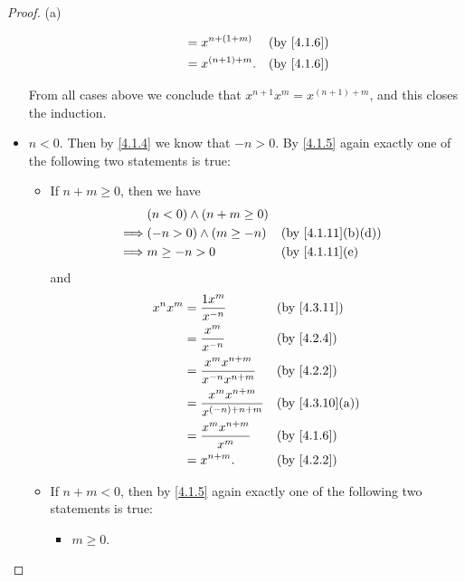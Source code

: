 \begin{proof}{(a)}
\begin{itemize}
\begin{itemize}
\begin{align*}
                                & = x^{n + (1 + m)}  &  & \by{4.1.6}    \\
                                & = x^{(n + 1) + m}. &  & \by{4.1.6}
                  \end{align*}
          \end{itemize}
          From all cases above we conclude that \(x^{n + 1} x^m = x^{(n + 1) + m}\), and this closes the induction.
    \item \(n < 0\).
          Then by \cref{4.1.4} we know that \(-n > 0\).
          By \cref{4.1.5} again exactly one of the following two statements is true:
          \begin{itemize}
            \item If \(n + m \geq 0\), then we have
                  \begin{align*}
                             & (n < 0) \land (n + m \geq 0)                                      \\
                    \implies & (-n > 0) \land (m \geq -n)   &  & \text{(by \cref{4.1.11}(b)(d))} \\
                    \implies & m \geq -n > 0                &  & \text{(by \cref{4.1.11}(e)}
                  \end{align*}
                  and
                  \begin{align*}
                    x^n x^m & = \dfrac{1x^m}{x^{-n}}                    &  & \by{4.3.11}                  \\
                            & = \dfrac{x^m}{x^{-n}}                     &  & \by{4.2.4}                   \\
                            & = \dfrac{x^m x^{n + m}}{x^{-n} x^{n + m}} &  & \by{4.2.2}                   \\
                            & = \dfrac{x^m x^{n + m}}{x^{(-n) + n + m}} &  & \text{(by \cref{4.3.10}(a))} \\
                            & = \dfrac{x^m x^{n + m}}{x^m}              &  & \by{4.1.6}                   \\
                            & = x^{n + m}.                              &  & \by{4.2.2}
                  \end{align*}
            \item If \(n + m < 0\), then by \cref{4.1.5} again exactly one of the following two statements is true:
                  \begin{itemize}
                    \item \(m \geq 0\).

\end{itemize}
\end{itemize}
\end{itemize}
\end{proof}
